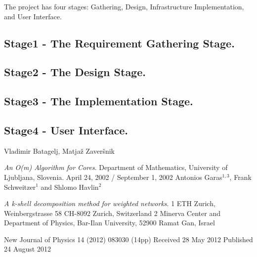 \documentclass[10pt,conference]{IEEEtran}
\begin{document}
The project has four stages: Gathering, Design, Infrastructure Implementation, and User Interface.

%
\subsection{Stage1 - The Requirement Gathering Stage. }\label{sec:1 Requirement Gathering Stage. }


\subsection{Stage2 - The Design Stage. }\label{sec: 2:The Design Stage.}


\subsection{Stage3 - The Implementation Stage. }\label{sec: 3 The Implementation Stage.}


\subsection{Stage4 -	User Interface. }\label{sec: 4. User Interface.}


%


\begin{thebibliography}{999}
    Vladimir Batagelj, Matja{\v z} Zaver{\v s}nik
    
    \emph{An O(m) Algorithm for Cores}.
    Department of Mathematics, University of Ljubljana, Slovenia.
    April 24, 2002 / September 1, 2002
     Antonios Garas$^{1,3}$, Frank Schweitzer$^1$ and Shlomo Havlin$^2$

    
    \emph{A k-shell decomposition method for weighted networks}.
    1 ETH Zurich, Weinbergstrasse 58 CH-8092 Zurich, Switzerland
    2 Minerva Center and Department of Physics, Bar-Ilan University,
    52900 Ramat Gan, Israel

    New Journal of Physics 14 (2012) 083030 (14pp)
    Received 28 May 2012
    Published 24 August 2012
\end{thebibliography}
\end{document}
